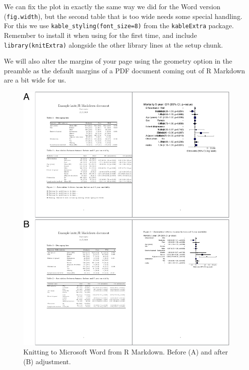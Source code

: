 \documentclass[
  12pt,
  krantz2]{krantz}
\begin{document}
We can fix the plot in exactly the same way we did for the Word version (\texttt{fig.width}), but the second table that is too wide needs some special handling.
For this we use \texttt{kable\_styling(font\_size=8)} from the \texttt{kableExtra} package.
Remember to install it when using for the first time, and include \texttt{library(knitExtra)} alongside the other library lines at the setup chunk.

We will also alter the margins of your page using the geometry option in the preamble as the default margins of a PDF document coming out of R Markdown are a bit wide for us.

\begin{figure}
\includegraphics[width=0.7\linewidth]{images/chapter13/1_pdf_knit} \caption{Knitting to Microsoft Word from R Markdown. Before (A) and after (B) adjustment.}\label{fig:chap13-fig-pdf}
\end{figure}
\end{document}
